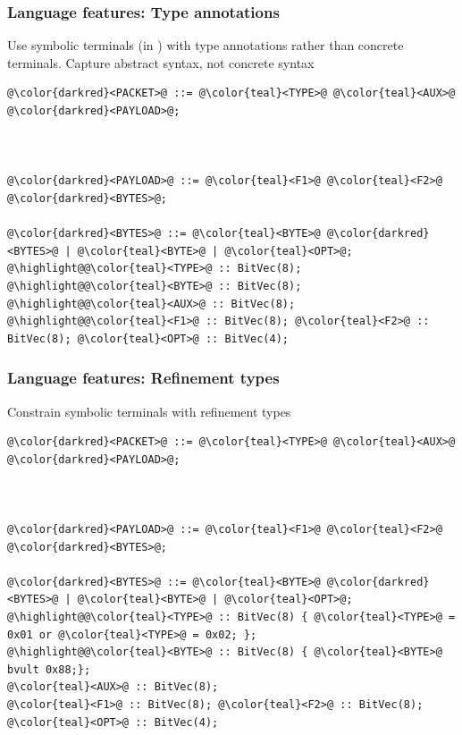 \documentclass[11pt,xcolor={dvipsnames},hyperref={pdftex,pdfpagemode=UseNone,hidelinks,pdfdisplaydoctitle=true},usepdftitle=false]{beamer}
\newcommand{\green}[1]{\textcolor{green!60!black}{#1}}
\newcommand{\teal}[1]{{\color{teal}{#1}}}
\begin{document}
\begin{frame}[fragile]
    \frametitle{Language features: Type annotations}\pause
Use \green{symbolic terminals} (in \teal {teal}) with \green{type annotations} rather than 
concrete terminals. Capture \green{abstract syntax}, not \green{concrete syntax}\\[4pt]
\begin{lstlisting}[style=goblin]
@\color{darkred}<PACKET>@ ::= @\color{teal}<TYPE>@ @\color{teal}<AUX>@ @\color{darkred}<PAYLOAD>@;



@\color{darkred}<PAYLOAD>@ ::= @\color{teal}<F1>@ @\color{teal}<F2>@ @\color{darkred}<BYTES>@; 

@\color{darkred}<BYTES>@ ::= @\color{teal}<BYTE>@ @\color{darkred}<BYTES>@ | @\color{teal}<BYTE>@ | @\color{teal}<OPT>@;
@\highlight@@\color{teal}<TYPE>@ :: BitVec(8);
@\highlight@@\color{teal}<BYTE>@ :: BitVec(8); 
@\highlight@@\color{teal}<AUX>@ :: BitVec(8); 
@\highlight@@\color{teal}<F1>@ :: BitVec(8); @\color{teal}<F2>@ :: BitVec(8); @\color{teal}<OPT>@ :: BitVec(4); 
\end{lstlisting}
\end{frame}

\begin{frame}[fragile]
    \frametitle{Language features: Refinement types}\pause
Constrain symbolic terminals with \green{refinement types}\\[4pt]
\begin{lstlisting}[style=goblin]
@\color{darkred}<PACKET>@ ::= @\color{teal}<TYPE>@ @\color{teal}<AUX>@ @\color{darkred}<PAYLOAD>@;



@\color{darkred}<PAYLOAD>@ ::= @\color{teal}<F1>@ @\color{teal}<F2>@ @\color{darkred}<BYTES>@; 

@\color{darkred}<BYTES>@ ::= @\color{teal}<BYTE>@ @\color{darkred}<BYTES>@ | @\color{teal}<BYTE>@ | @\color{teal}<OPT>@;
@\highlight@@\color{teal}<TYPE>@ :: BitVec(8) { @\color{teal}<TYPE>@ = 0x01 or @\color{teal}<TYPE>@ = 0x02; };   
@\highlight@@\color{teal}<BYTE>@ :: BitVec(8) { @\color{teal}<BYTE>@ bvult 0x88;}; 
@\color{teal}<AUX>@ :: BitVec(8); 
@\color{teal}<F1>@ :: BitVec(8); @\color{teal}<F2>@ :: BitVec(8); @\color{teal}<OPT>@ :: BitVec(4); 
\end{lstlisting}
\end{frame}
\end{document}

